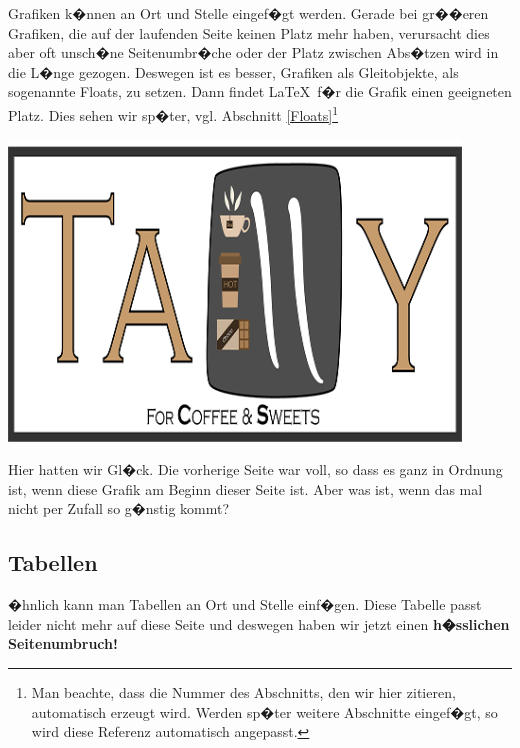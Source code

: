 \documentclass[11pt,a4paper]{article} %
\begin{document}
Grafiken k�nnen an Ort und Stelle eingef�gt werden. Gerade bei gr��eren Grafiken, die auf der laufenden Seite keinen Platz mehr haben, verursacht dies aber oft unsch�ne Seitenumbr�che oder der Platz zwischen Abs�tzen wird in die L�nge gezogen. Deswegen ist es besser, Grafiken als Gleitobjekte, als sogenannte \glqq Floats\grqq, zu setzen. Dann findet \LaTeX\ f�r die Grafik einen geeigneten Platz. Dies sehen wir sp�ter, vgl. Abschnitt \ref{Floats}\footnote{Man beachte, dass die Nummer des Abschnitts, den wir hier zitieren, automatisch erzeugt wird. Werden sp�ter weitere Abschnitte eingef�gt, so wird diese Referenz automatisch angepasst.}

\begin{center}
\includegraphics[width=12cm]{TallyLogo.png}
\end{center}

Hier hatten wir Gl�ck. Die vorherige Seite war voll, so dass es ganz in Ordnung ist, wenn diese Grafik am Beginn dieser Seite ist. Aber was ist, wenn das mal nicht per Zufall so g�nstig kommt?

\subsection{Tabellen}
\label{Tabellen}

�hnlich kann man Tabellen an Ort und Stelle einf�gen. Diese Tabelle passt leider nicht mehr auf diese Seite und deswegen haben wir jetzt einen \textbf{h�sslichen Seitenumbruch!}
\end{document}
